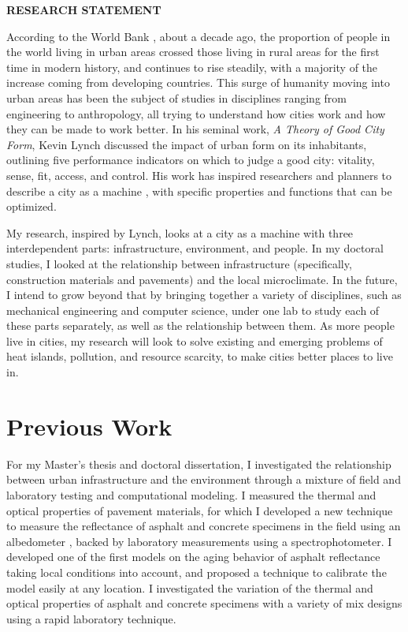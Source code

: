 \documentclass[12pt]{article}
\begin{document}
 \sloppy %

\begin{center}
{\large \uppercase{\textbf{Research Statement}}}
\end{center}

According to the World Bank \cite{Urbanpop19:online}, about a decade ago, the proportion of people in the world living in urban areas crossed those living in rural areas for the first time in modern history, and continues to rise steadily, with a majority of the increase coming from developing countries. This surge of humanity moving into urban areas has been the subject of studies in disciplines ranging from engineering to anthropology, all trying to understand how cities work and how they can be made to work better. In his seminal work, \textit{A Theory of Good City Form}, Kevin Lynch \cite{lynch1984good} discussed the impact of urban form on its inhabitants, outlining five performance indicators on which to judge a good city: vitality, sense, fit, access, and control. His work has inspired researchers and planners to describe a city as a machine \cite{molotch1976city, mcfarlane2011city, lloyd2001city, oke1973city}, with specific properties and functions that can be optimized.

My research, inspired by Lynch, looks at a city as a machine with three interdependent parts: infrastructure, environment, and people. In my doctoral studies, I looked at the relationship between infrastructure (specifically, construction materials and pavements) and the local microclimate. In the future, I intend to grow beyond that by bringing together a variety of disciplines, such as mechanical engineering and computer science, under one lab to study each of these parts separately, as well as the relationship between them. As more people live in cities, my research will look to solve existing and emerging problems of heat islands, pollution, and resource scarcity, to make cities better places to live in.

\section*{Previous Work}
For my Master's thesis and doctoral dissertation, I investigated the relationship between urban infrastructure and the environment through a mixture of field and laboratory testing and computational modeling. I measured the thermal and optical properties of pavement materials, for which I developed a new technique to measure the reflectance of asphalt and concrete specimens in the field using an albedometer \cite{sen2018albedo}, backed by laboratory measurements using a spectrophotometer. I developed one of the first models on the aging behavior of asphalt reflectance \cite{sen2016aging} taking local conditions into account, and proposed a technique to calibrate the model easily at any location. I investigated the variation of the thermal and optical properties of asphalt and concrete specimens with a variety of mix designs using a rapid laboratory technique.
\end{document}
